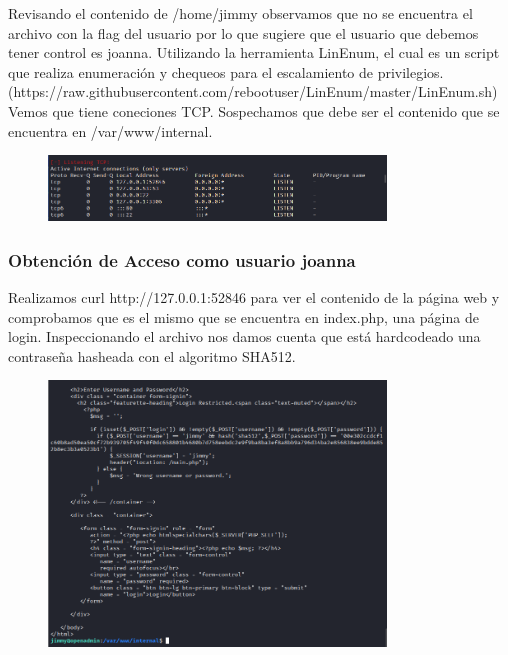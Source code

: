 \documentclass{article}
\begin{document}
Revisando el contenido de /home/jimmy observamos que no se encuentra el archivo con la flag del usuario por lo que sugiere que el usuario que debemos tener control es joanna.
Utilizando la herramienta LinEnum, el cual es un script que realiza enumeración y chequeos para el escalamiento de privilegios. (https://raw.githubusercontent.com/rebootuser/LinEnum/master/LinEnum.sh) Vemos que tiene coneciones TCP. Sospechamos que debe ser el contenido que se encuentra en /var/www/internal.
\begin{figure}[H]
	\center
	\includegraphics[width=0.8\textwidth]{images/openadmin/11-tcp.png}
	\caption{}
\end{figure}

\subsubsection{Obtención de Acceso como usuario joanna}

Realizamos curl http://127.0.0.1:52846 para ver el contenido de la página web y comprobamos que es el mismo que se encuentra en index.php, una página de login. Inspeccionando el archivo nos damos cuenta que está hardcodeado una contraseña hasheada con el algoritmo SHA512. 
\begin{figure}[H]
	\center
	\includegraphics[width=0.8\textwidth]{images/openadmin/12-indexphp.png}
	\caption{}
\end{figure}
\end{document}
